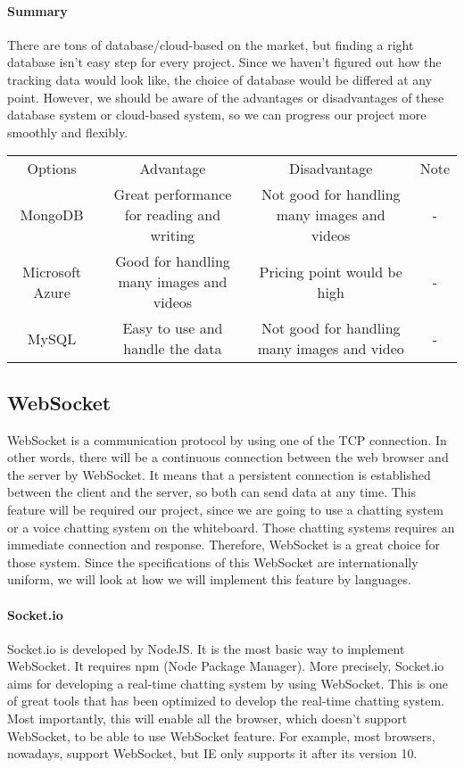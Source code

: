 \documentclass[10pt]{article}
\begin{document}
            \paragraph{Summary}
                There are tons of database/cloud-based on the market, but finding a right database isn’t easy step for every project. Since we haven’t figured out how the tracking data would look like, the choice of database would be differed at any point. However, we should be aware of the advantages or disadvantages of these database system or cloud-based system, so we can progress our project more smoothly and flexibly.

                \begin{center}
                \begin{tabular}{ |c|c|c|c| } \hline
                     Options & Advantage & Disadvantage & Note \\ 
                     MongoDB & Great performance for reading and writing & Not good for handling many images and videos & - \\ 
                     Microsoft Azure & Good for handling many images and videos & Pricing point would be high & -\\ 
                     MySQL & Easy to use and handle the data & Not good for handling many images and video & -\\ 
                     \hline
                \end{tabular}
                \end{center}
        
        \subsection{WebSocket}
            WebSocket is a communication protocol by using one of the TCP connection. In other words, there will be a continuous connection between the web browser and the server by WebSocket. It means that a persistent connection is established between the client and the server, so both can send data at any time. This feature will be required our project, since we are going to use a chatting system or a voice chatting system on the whiteboard. Those chatting systems requires an immediate connection and response. Therefore, WebSocket is a great choice for those system. Since the specifications of this WebSocket are internationally uniform, we will look at how we will implement this feature by languages.
        
            \paragraph{Socket.io}
                Socket.io is developed by NodeJS. It is the most basic way to implement WebSocket. It requires npm (Node Package Manager). More precisely, Socket.io aims for developing a real-time chatting system by using WebSocket. This is one of great tools that has been optimized to develop the real-time chatting system. Most importantly, this will enable all the browser, which doesn’t support WebSocket, to be able to use WebSocket feature. For example, most browsers, nowadays, support WebSocket, but IE only supports it after its version 10. \cite{si}
            
\end{document}
